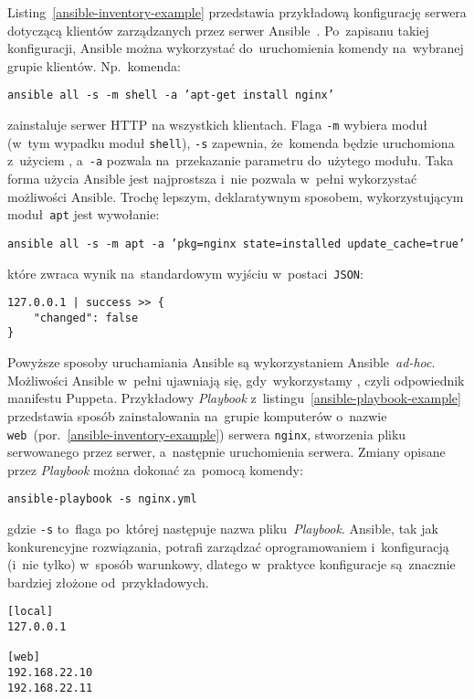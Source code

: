 \documentclass[thesis]{subfiles}
\begin{document}
Listing~\ref{ansible-inventory-example} przedstawia przykładową konfigurację serwera dotyczącą klientów zarządzanych przez serwer Ansible~\cite{ansible-example}. Po~zapisanu takiej konfiguracji, Ansible można wykorzystać do~uruchomienia komendy na~wybranej grupie klientów. Np.~komenda:
\begin{center}
\texttt{ansible all -s -m shell -a 'apt-get install nginx'}
\end{center}
zainstaluje serwer HTTP  na wszystkich klientach. Flaga \texttt{-m} wybiera moduł (w~tym wypadku moduł \texttt{shell}), \texttt{-s} zapewnia, że~komenda będzie uruchomiona z~użyciem , a~\texttt{-a} pozwala na~przekazanie parametru do~użytego modułu. Taka forma użycia Ansible jest najprostsza i~nie pozwala w~pełni wykorzystać możliwości Ansible. Trochę lepszym, deklaratywnym sposobem, wykorzystującym moduł~\texttt{apt} jest wywołanie:
\begin{center}
\texttt{ansible all -s -m apt -a 'pkg=nginx state=installed update\_cache=true'}
\end{center}
które zwraca wynik na~standardowym wyjściu w~postaci~\texttt{JSON}:
\begin{lstlisting}[numbers=none,frame=none]
127.0.0.1 | success >> {
    "changed": false
}
\end{lstlisting}
Powyższe sposoby uruchamiania Ansible są wykorzystaniem Ansible~\emph{ad-hoc}. Możliwości Ansible w~pełni ujawniają się, gdy~wykorzystamy , czyli odpowiednik manifestu Puppeta. Przykładowy \emph{Playbook} z~listingu~\ref{ansible-playbook-example} przedstawia sposób zainstalowania na~grupie komputerów o~nazwie \texttt{web}~(por.~\ref{ansible-inventory-example}) serwera \texttt{nginx}, stworzenia pliku serwowanego przez serwer, a~następnie uruchomienia  serwera. Zmiany opisane przez \emph{Playbook} można dokonać za~pomocą komendy:
\begin{center}
\texttt{ansible-playbook -s nginx.yml}
\end{center}
gdzie \texttt{-s} to~flaga po~której następuje nazwa pliku~\emph{Playbook}. Ansible, tak jak konkurencyjne rozwiązania, potrafi zarządzać oprogramowaniem i~konfiguracją (i~nie tylko) w~sposób warunkowy, dlatego w~praktyce konfiguracje są~znacznie bardziej złożone od~przykładowych.

\begin{lstlisting}[numbers=none,caption={Przykładowy plik konfiguracyjny klientów serwera Ansible (w~numenklaturze Ansible nazywany \hrefemph{http://docs.ansible.com/ansible/intro_inventory.html}{Inventory file}), zwyczajowo zapisywany w~\texttt{/etc/ansible/hosts}, definiujący adresy~IP zarządzanych klientów},label=ansible-inventory-example]
[local]
127.0.0.1

[web]
192.168.22.10
192.168.22.11
\end{lstlisting}
\end{document}
